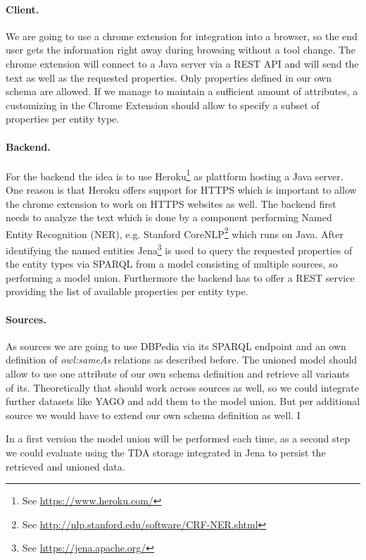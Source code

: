 \documentclass[11pt,titlepage,oneside,openany]{article}
\begin{document}
\paragraph{Client.}
We are going to use a chrome extension for integration into a browser, so the end user gets the information right away during browsing without a tool change. The chrome extension will connect to a Java server via a REST API and will send the text as well as the requested properties. Only properties defined in our own schema are allowed. If we manage to maintain a sufficient amount of attributes, a customizing in the Chrome Extension should allow to specify a subset of properties per entity type. 

\paragraph{Backend.}
For the backend the idea is to use Heroku\footnote{See \url{https://www.heroku.com/}} as plattform hosting a Java server. One reason is that Heroku offers support for HTTPS which is important to allow the chrome extension to work on HTTPS websites as well.
The backend first needs to analyze the text which is done by a component performing Named Entity Recognition (NER), e.g. Stanford CoreNLP\footnote{See \url{http://nlp.stanford.edu/software/CRF-NER.shtml}} which runs on Java. After identifying the named entities Jena\footnote{See \url{https://jena.apache.org/}} is used to query the requested properties of the entity types via SPARQL from a model consisting of multiple sources, so performing a model union. 
Furthermore the backend has to offer a REST service providing the list of available properties per entity type.

\paragraph{Sources.}
As sources we are going to use DBPedia via its SPARQL endpoint and an own definition of \textit{owl:sameAs} relations as described before. The unioned model should allow to use one attribute of our own schema definition and retrieve all variants of its. Theoretically that should work across sources as well, so we could integrate further datasets like YAGO and add them to the model union. But per additional source we would have to extend our own schema definition as well. I

In a first version the model union will be performed each time, as a second step we could evaluate using the TDA storage integrated in Jena to persist the retrieved and unioned data. 
\end{document}
